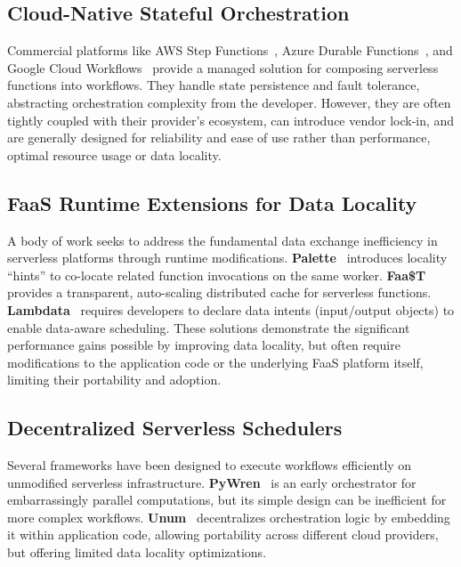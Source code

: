 \documentclass[conference]{IEEEtran}
\begin{document}
\subsection{Cloud-Native Stateful Orchestration}
Commercial platforms like AWS Step Functions~\cite{aws_step_functions}, Azure Durable Functions~\cite{azure_durable_functions}, and Google Cloud Workflows~\cite{google_cloud_workflows} provide a managed solution for composing serverless functions into workflows. They handle state persistence and fault tolerance, abstracting orchestration complexity from the developer. However, they are often tightly coupled with their provider's ecosystem, can introduce vendor lock-in, and are generally designed for reliability and ease of use rather than performance, optimal resource usage or data locality.

\subsection{FaaS Runtime Extensions for Data Locality}
A body of work seeks to address the fundamental data exchange inefficiency in serverless platforms through runtime modifications. \textbf{Palette}~\cite{palette_load_balancing} introduces locality ``hints'' to co-locate related function invocations on the same worker. \textbf{Faa\$T}~\cite{faast_caching} provides a transparent, auto-scaling distributed cache for serverless functions. \textbf{Lambdata}~\cite{lambdata_intents} requires developers to declare data intents (input/output objects) to enable data-aware scheduling. These solutions demonstrate the significant performance gains possible by improving data locality, but often require modifications to the application code or the underlying FaaS platform itself, limiting their portability and adoption.

\subsection{Decentralized Serverless Schedulers}
Several frameworks have been designed to execute workflows efficiently on unmodified serverless infrastructure. \textbf{PyWren}~\cite{pywren} is an early orchestrator for embarrassingly parallel computations, but its simple design can be inefficient for more complex workflows. \textbf{Unum}~\cite{unum_decentralized_orchestrator} decentralizes orchestration logic by embedding it within application code, allowing portability across different cloud providers, but offering limited data locality optimizations.
\end{document}
